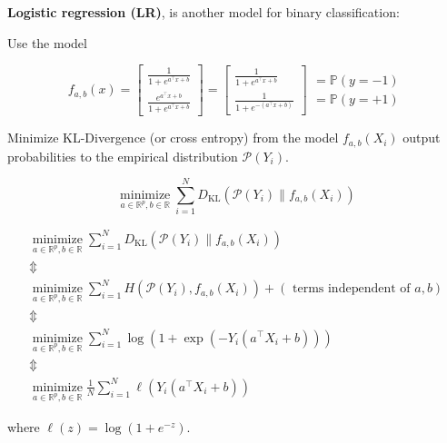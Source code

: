 \begin{definition}
    \textbf{Logistic regression (LR)}, is another model for binary classification:

    Use the model

    $$
    f_{a, b}(x)=\left[\begin{array}{c}
    \frac{1}{1+e^{a^{\top} x+b}} \\
    \frac{e^{a^{\top} x+b}}{1+e^{a^{\top} x+b}}
    \end{array}\right]=\left[\begin{array}{c}
    \frac{1}{1+e^{a^{\top} x+b}} \\
    \frac{1}{1+e^{-\left(a^{\top} x+b\right)}}
    \end{array}\right]\begin{array}{c}
    = \mathbb{P}(y=-1) \\
    = \mathbb{P}(y=+1)
    \end{array}
    $$

    Minimize KL-Divergence (or cross entropy) from the model $f_{a, b}\left(X_{i}\right)$ output probabilities to the empirical distribution $\mathcal{P}\left(Y_{i}\right)$.

    $$
    \underset{a \in \mathbb{R}^{p}, b \in \mathbb{R}}{\operatorname{minimize}} \sum_{i=1}^{N} D_{\mathrm{KL}}\left(\mathcal{P}\left(Y_{i}\right) \| f_{a, b}\left(X_{i}\right)\right)
    $$
\end{definition}

\begin{concept}
    $$
    \begin{gathered}
    \underset{a \in \mathbb{R}^{p}, b \in \mathbb{R}}{\operatorname{minimize}} \sum_{i=1}^{N} D_{\mathrm{KL}}\left(\mathcal{P}\left(Y_{i}\right) \| f_{a, b}\left(X_{i}\right)\right) \\
    \mathbb{\Updownarrow} \\
    \underset{a \in \mathbb{R}^{p}, b \in \mathbb{R}}{\operatorname{minimize}} \sum_{i=1}^{N} H\left(\mathcal{P}\left(Y_{i}\right), f_{a, b}\left(X_{i}\right)\right)+(\text { terms independent of } a, b) \\
    \mathbb{\Updownarrow} \\
    \underset{a \in \mathbb{R}^{p}, b \in \mathbb{R}}{\operatorname{minimize}} \sum_{i=1}^{N} \log \left(1+\exp \left(-Y_{i}\left(a^{\top} X_{i}+b\right)\right)\right) \\
    \mathbb{\Updownarrow} \\
    \underset{a \in \mathbb{R}^{p}, b \in \mathbb{R}}{\operatorname{minimize}} \frac{1}{N} \sum_{i=1}^{N} \ell\left(Y_{i}\left(a^{\top} X_{i}+b\right)\right)
    \end{gathered}
    $$

    where $\ell(z)=\log \left(1+e^{-z}\right)$.
\end{concept}

